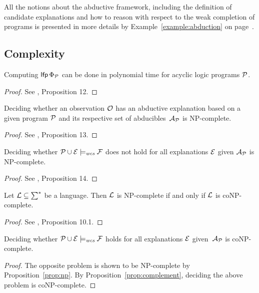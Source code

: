 All the notions about the abductive framework, including the definition of candidate explanations and how to reason with respect to the weak completion of programs is presented in more details by Example~\ref{example:abduction} on page~\pageref{example:abduction}.

\subsection{Complexity}

\begin{prop}
\label{prop:hasexp}
\normalfont
Computing $\mathsf{lfp}\, \Phi_{\mathcal{P}}$ can be done in polynomial time for acyclic logic programs $\mathcal{P}$.
\begin{proof}
See \cite{saldanha1872contextual}, Proposition 12.
\end{proof}
\end{prop}

\begin{prop}
\label{prop:hasexp}
\normalfont
Deciding whether an observation $\mathcal{O}$ has an abductive explanation based on a given program $\mathcal{P}$ and its respective set of abducibles~$\mathcal{A}_{\mathcal{P}}$ is NP-complete.
\begin{proof}
See \cite{saldanha1872contextual}, Proposition 13.
\end{proof}
\end{prop}

\begin{prop}
\label{prop:np}
\normalfont
Deciding whether $\mathcal{P} \cup \mathcal{E} \models_{\normalfont\textit{wcs}} \mathcal{F}$ does not hold for all explanations $\mathcal{E}$ given $\mathcal{A}_{\mathcal{P}}$ is NP-complete.
\begin{proof}
See \cite{saldanha1872contextual}, Proposition 14.
\end{proof}
\end{prop}

\begin{prop}
\label{prop:complement}
\normalfont
Let $\mathcal{L} \subseteq \sum^*$ be a language. Then $\mathcal{L}$ is NP-complete if and only if $\mathcal{L}$ is coNP-complete.
\begin{proof}
See \cite{papadimitriou2003computational}, Proposition 10.1.
\end{proof}
\end{prop}

\begin{prop}
\label{prop:hasexp}
\normalfont
Deciding whether $\mathcal{P} \cup \mathcal{E} \models_{\normalfont\textit{wcs}} \mathcal{F}$ holds for all explanations $\mathcal{E}$ given~$\mathcal{A}_{\mathcal{P}}$ is coNP-complete.
\begin{proof}
The opposite problem is shown to be NP-complete by Proposition~\ref{prop:np}. By Proposition~\ref{prop:complement}, deciding the above problem is coNP-complete.
\end{proof}
\end{prop}


